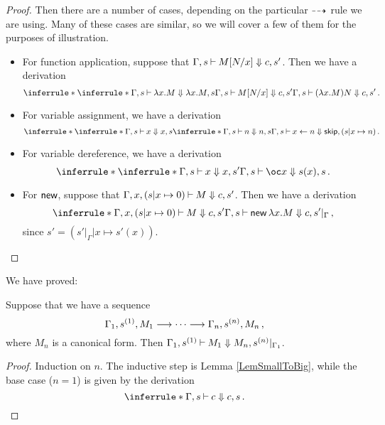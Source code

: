 \begin{proof}
  Then there are a number of cases, depending on the particular $\dashrightarrow$ rule we are using.  
  Many of these cases are similar, so we will cover a few of them for the purposes of illustration.
  \begin{itemize}
    \item For function application, suppose that $\Gamma,s\mathbin{\vdash} M[N/x]\Downarrow c,s'$.  
      Then we have a derivation
      \[
        \inferrule*
        {
          \inferrule*
          {
          }
          {
            \Gamma,s \ts \lambda x.M \converges \lambda x.M,s
          }
          \\
          \Gamma,s\ts M[N/x] \converges c,s'
        }
        {
          \Gamma,s\ts (\lambda x.M)N \converges c,s'
        }\,.
        \]
    \item For variable assignment, we have a derivation
      \[
        \inferrule*
        {
          \inferrule*
          {
          }
          {
            \Gamma,s\ts x\converges x,s
          }
          \\
          \inferrule*
          {
          }
          {
            \Gamma,s\ts n\converges n,s
          }
        }
        {
          \Gamma,s\ts x\gets n\converges \skipp,(s\vert x\mapsto n)
        }\,.
        \]
    \item For variable dereference, we have a derivation
      \[
        \inferrule*
        {
          \inferrule*
          {
          }
          {
            \Gamma,s\ts x \converges x,s'
          }
        }
        {
          \Gamma,s\ts \oc x\converges s(x),s
        }\,.
        \]
    \item For $\operatorname{{\mathsf{new}}}$, suppose that $\Gamma,x,(s\vert x\mapsto 0) \mathbin{\vdash} M\Downarrow c,s'$.  
      Then we have a derivation
      \[
        \inferrule*
        {
          \Gamma,x,(s\vert x\mapsto 0) \ts M \converges c,s'
        }
        {
          \Gamma,s\ts \neww\lambda x.M \converges c,s'\vert_\Gamma
        }\,,
        \]
      since $s'=(s'\vert_\Gamma\vert x\mapsto s'(x))$.\qedhere
  \end{itemize}
\end{proof}

We have proved:

\begin{proposition}
  Suppose that we have a sequence
  \[
    \Gamma_1,s^{(1)},M_1\longrightarrow\cdots\longrightarrow\Gamma_n,s^{(n)},M_n\,,
    \]
  where $M_n$ is a canonical form.  
  Then $\Gamma_1,s^{(1)} \mathbin{\vdash} M_1\Downarrow M_n,s^{(n)}\vert_{\Gamma_1}$.  
  \label{PropSmallToBig}
\end{proposition}
\begin{proof}
  Induction on $n$.  
  The inductive step is Lemma \ref{LemSmallToBig}, while the base case ($n=1$) is given by the derivation
  \[
    \inferrule*{ }
    {\Gamma,s\ts c\converges c,s}\,.\qedhere
    \]
\end{proof}

